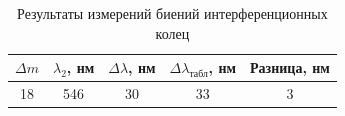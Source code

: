 \documentclass[a4paper, 12pt]{article}
\begin{document}
\begin{table}[H]
    \centering
    \begin{tabular}{ccccc}
        \toprule
        $\Delta m$ & $\lambda_2$, нм & $\Delta \lambda$, нм & $\Delta \lambda_{\text{табл}}$, нм & Разница, нм \\
        \midrule
        18 & 546 & 30 & 33 & 3 \\
        \bottomrule
    \end{tabular}
    \caption{Результаты измерений биений интерференционных колец}
    \label{beating}
\end{table}


\begin{figure}[H]
    \centering
    \renewcommand{\arraystretch}{0.8} %
    \setlength{\tabcolsep}{5pt} %
    

\end{figure}
\end{document}
